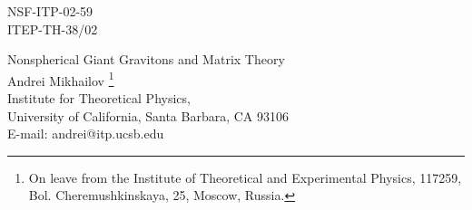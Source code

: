 \documentclass[a4paper,12pt]{article}
\begin{document}
\begin{titlepage}
\begin{flushright}
NSF-ITP-02-59\\
ITEP-TH-38/02\\
\end{flushright}

\begin{center}
{\Large $ $ \\ $ $ \\
Nonspherical Giant Gravitons and Matrix Theory}\\
\bigskip\bigskip\bigskip
{\large Andrei Mikhailov}
\footnote{On leave from the Institute of Theoretical and
Experimental Physics, 117259, Bol. Cheremushkinskaya, 25,
Moscow, Russia.}\\
\bigskip
Institute for Theoretical Physics,\\
University of California, Santa Barbara, CA 93106\\
\vskip 1cm
E-mail: andrei@itp.ucsb.edu
\end{center}
\vskip 1cm
\begin{abstract}
We consider the plane wave limit of the nonspherical giant gravitons.
We compute the Poisson brackets of the coordinate functions and find
a nonlinear algebra. We show that this algebra solves the supersymmetry
conditions of the matrix model. This is the generalization of the
algebraic realization of the spherical membrane as the ``fuzzy sphere''.
We describe finite dimensional representations of the algebra 
corresponding to the fuzzy torus.
\end{abstract}
\end{titlepage}
\end{document}
